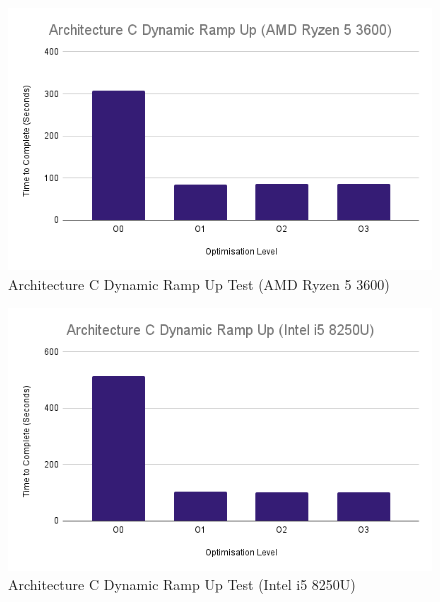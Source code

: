 \documentclass{article}
\begin{document}
\begin{figure}[!h]
\centering
\includegraphics[scale=0.5]{Architecture C Dynamic Ramp Up (AMD Ryzen 5 3600).png}
\caption{Architecture C Dynamic Ramp Up Test (AMD Ryzen 5 3600)}
\label{arch_c_dynamic_ramp_up_pc}
\end{figure}

\begin{figure}[!h]
\centering
\includegraphics[scale=0.5]{Architecture C Dynamic Ramp Up (Intel i5 8250U).png}
\caption{Architecture C Dynamic Ramp Up Test (Intel i5 8250U)}
\label{arch_c_dynamic_ramp_up_laptop}
\end{figure}

\clearpage
\end{document}
